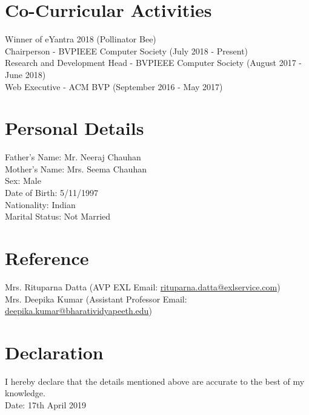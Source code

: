 \documentclass{article}
\begin{document}
\section{Co-Curricular Activities}
Winner of eYantra 2018 (Pollinator Bee)
\\Chairperson - BVPIEEE Computer Society (July 2018 - Present)
\\Research and Development Head - BVPIEEE Computer Society (August 2017 - June 2018)
\\Web Executive - ACM BVP (September 2016 - May 2017)

\section{Personal Details}
Father's Name: Mr. Neeraj Chauhan
\\ Mother's Name: Mrs. Seema Chauhan
\\ Sex: Male
\\ Date of Birth: 5/11/1997
\\ Nationality: Indian
\\ Marital Status: Not Married

\section{Reference}
Mrs. Rituparna Datta (AVP EXL Email: \href{mailto:rituparna.datta@exlservice.com}{rituparna.datta@exlservice.com})
\\Mrs. Deepika Kumar (Assistant Professor Email: \href{mailto:deepika.kumar@bharatividyapeeth.edu}{deepika.kumar@bharatividyapeeth.edu})

\section{Declaration}
I hereby declare that the details mentioned above are accurate to the best of my knowledge.
\\Date: 17th April 2019
\end{document}
